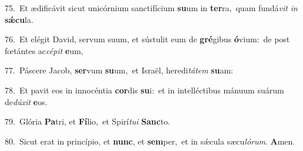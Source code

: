 {\numbfont\textcolor{\numbcolor}{75.}}~Et ædificávit sicut unicórnium sanctifícium \textbf{su}\-um in \textbf{ter}\-ra,~\star quam fundá\textit{vit} \textit{in} \textbf{sǽ}\-\textbf{cu}la.\par
{\numbfont\textcolor{\numbcolor}{76.}}~Et elégit David, servum suum, et sústulit eum de \textbf{gré}\-gibus \textbf{ó}\-vium:~\star de post fœtántes ac\-\textit{cé}\-\textit{pit} \textbf{e}\-um,\par
{\numbfont\textcolor{\numbcolor}{77.}}~Páscere Jacob, \textbf{ser}\-vum \textbf{su}\-um,~\star et Israël, heredi\-\textit{tá}\-\textit{tem} \textbf{su}\-am:\par
{\numbfont\textcolor{\numbcolor}{78.}}~Et pavit eos in innocéntia \textbf{cor}\-dis \textbf{su}\-i:~\star et in intelléctibus mánuum suárum de\-\textit{dú}\-\textit{xit} \textbf{e}\-os.\par
{\numbfont\textcolor{\numbcolor}{79.}}~Glória \textbf{Pa}\-tri, et \textbf{Fí}\-lio,~\star et Spirí\-\textit{tu}\-\textit{i} \textbf{Sanc}\-to.\par
{\numbfont\textcolor{\numbcolor}{80.}}~Sicut erat in princípio, et \textbf{nunc}\-, et \textbf{sem}\-per,~\star et in sǽcula sæcu\-\textit{ló}\-\textit{rum}. \textbf{A}\-men.\par
